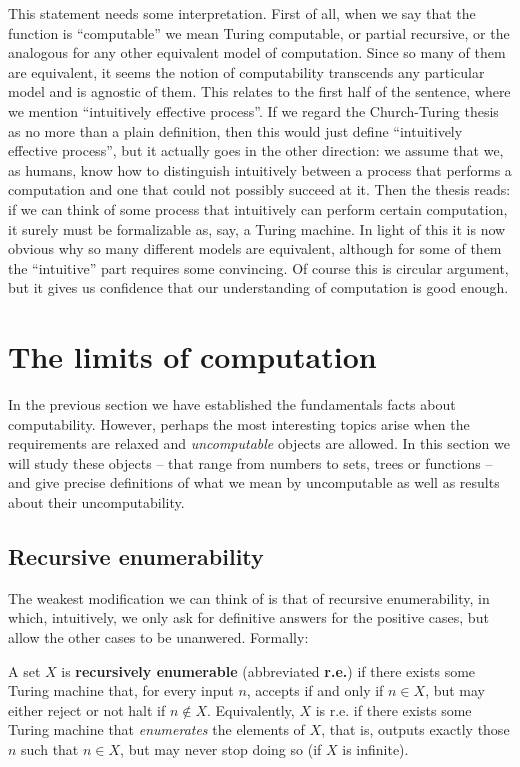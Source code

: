 \documentclass[../main.tex]{memoir}
\begin{document}
This statement needs some interpretation. First of all, when we say that the function is ``computable'' we mean Turing computable, or partial recursive, or the analogous for any other equivalent model of computation. Since so many of them are equivalent, it seems the notion of computability transcends any particular model and is agnostic of them. This relates to the first half of the sentence, where we mention ``intuitively effective process''. If we regard the Church-Turing thesis as no more than a plain definition, then this would just define ``intuitively effective process'', but it actually goes in the other direction: we assume that we, as humans, know how to distinguish intuitively between a process that performs a computation and one that could not possibly succeed at it. Then the thesis reads: if we can think of some process that intuitively can perform certain computation, it surely must be formalizable as, say, a Turing machine. In light of this it is now obvious why so many different models are equivalent, although for some of them the ``intuitive'' part requires some convincing. Of course this is circular argument, but it gives us confidence that our understanding of computation is good enough.

\section{The limits of computation}

In the previous section we have established the fundamentals facts about computability. However, perhaps the most interesting topics arise when the requirements are relaxed and \textit{uncomputable} objects are allowed. In this section we will study these objects -- that range from numbers to sets, trees or functions -- and give precise definitions of what we mean by uncomputable as well as results about their uncomputability.

\subsection{Recursive enumerability}

The weakest modification we can think of is that of recursive enumerability, in which, intuitively, we only ask for definitive answers for the positive cases, but allow the other cases to be unanwered. Formally:

\begin{definition}
  A set $X$ is \textbf{recursively enumerable} (abbreviated \textbf{r.e.}) if there exists some Turing machine that, for every input $n$, accepts if and only if $n \in X$, but may either reject or not halt if $n \not\in X$. Equivalently, $X$ is r.e. if there exists some Turing machine that \textit{enumerates} the elements of $X$, that is, outputs exactly those $n$ such that $n \in X$, but may never stop doing so (if $X$ is infinite).
\end{definition}
\end{document}
